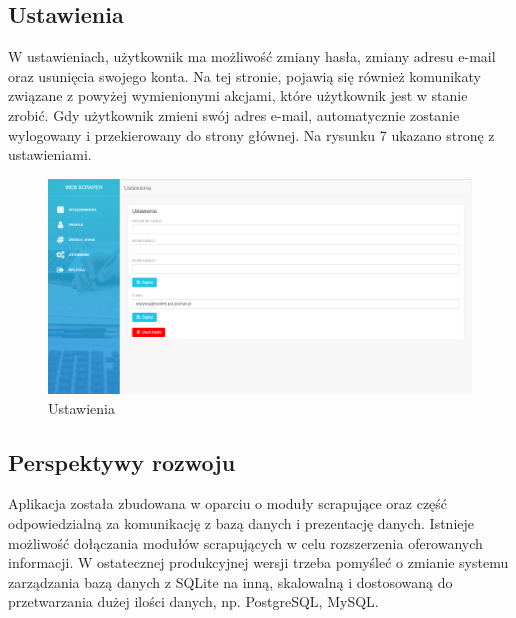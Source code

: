 \documentclass[12pt, titlepage]{article}
\begin{document}
	\subsection{Ustawienia}
	W ustawieniach, użytkownik ma możliwość zmiany hasła, zmiany adresu e-mail oraz usunięcia swojego konta. Na tej stronie, pojawią się również komunikaty związane z powyżej wymienionymi akcjami, które użytkownik jest w stanie zrobić. Gdy użytkownik zmieni swój adres e-mail, automatycznie zostanie wylogowany i przekierowany do strony głównej. Na rysunku 7 ukazano stronę z ustawieniami.
	\begin{figure}[H]
		\centering
		\includegraphics[scale=0.45]{obrazki/ustawienia.png}
		\caption{Ustawienia}
		\label{fig:db_schema}
	\end{figure}
	
	\newpage
	\subsection{Perspektywy rozwoju}
	Aplikacja została zbudowana w oparciu o moduły scrapujące oraz część odpowiedzialną za komunikację z bazą danych i prezentację danych. Istnieje możliwość dołączania modułów scrapujących w celu rozszerzenia oferowanych informacji. W ostatecznej produkcyjnej wersji trzeba pomyśleć o zmianie systemu zarządzania bazą danych z SQLite na inną, skalowalną i dostosowaną do przetwarzania dużej ilości danych, np. PostgreSQL, MySQL.
	
	\newpage
\end{document}
